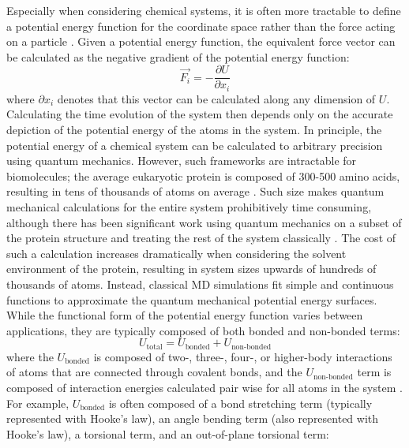 Especially when considering chemical systems, it is often more tractable to define a potential energy function for the coordinate space rather than the force acting on a particle \cite{Frenkel2002Understanding, Leach2001Molecular}. 
Given a potential energy function, the equivalent force vector can be calculated as the negative gradient of the potential energy function: 
\begin{equation} 
    \vec{F_i} = -\frac{\partial U}{\partial x_i}
\end{equation}
where $\partial x_i$ denotes that this vector can be calculated along any dimension of $U$. 
Calculating the time evolution of the system then depends only on the accurate depiction of the potential energy of the atoms in the system. 
In principle, the potential energy of a chemical system can be calculated to arbitrary precision using quantum mechanics. 
However, such frameworks are intractable for biomolecules; the average eukaryotic protein is composed of 300-500 amino acids, resulting in tens of thousands of atoms on average \cite{Kozlowski2017}. 
Such size makes quantum mechanical calculations for the entire system prohibitively time consuming, although there has been significant work using quantum mechanics on a subset of the protein structure and treating the rest of the system classically \cite{Senn2009, Tichauer2018}.
The cost of such a calculation increases dramatically when considering the solvent environment of the protein, resulting in system sizes upwards of hundreds of thousands of atoms. 
Instead, classical MD simulations fit simple and continuous functions to approximate the quantum mechanical potential energy surfaces. 
While the functional form of the potential energy function varies between applications, they are typically composed of both bonded and non-bonded terms: 
\begin{equation}
    U_{\text{total}} = U_{\text{bonded}} + U_{\text{non-bonded}}
\end{equation}
where the $U_{\text{bonded}}$ is composed of two-, three-, four-, or higher-body interactions of atoms that are connected through covalent bonds, and the $U_{\text{non-bonded}}$ term is composed of interaction energies calculated pair wise for all atoms in the system \cite{Kollman1981, Weiner1981, Weiner1984, Cornell1995, Duan2003, Jorgensen1996, Kaminski2001, Best2012}.
For example, $U_{\text{bonded}}$ is often composed of a bond stretching term (typically represented with Hooke's law), an angle bending term (also represented with Hooke's law), a torsional term, and an out-of-plane torsional term: 
